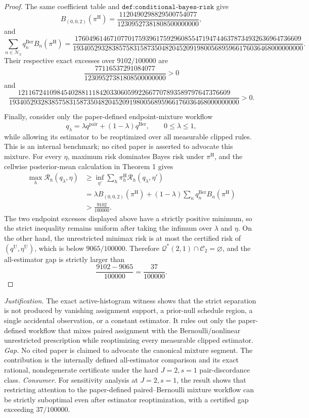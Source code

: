 \documentclass{article}
\begin{document}
\begin{proof}
The same coefficient table and \(\texttt{def:conditional-bayes-risk}\) give
\[
 B_{(0,0,2)}(\pi^{\mathrm H})
 =\frac{1120490298829500754077}{12309527381808500000000},
\]
and
\[
 \sum_{n\in\mathcal N_2}q_n^{\mathrm{Ber}}B_n(\pi^{\mathrm H})
 =\frac{1760496146710770175939617592960855471947446378734932636964736609}
 {19340529328385758315873504820452091980056895966176036468000000000}.
\]
Their respective exact excesses over \(9102/100000\) are
\[
 \frac{77116537291084077}{12309527381808500000000}>0
\]
and
\[
 \frac{121167241098454028811184203306059922667707893589797647376609}
 {19340529328385758315873504820452091980056895966176036468000000000}>0.
\]

Finally, consider only the paper-defined endpoint-mixture workflow
\[
 q_\lambda=\lambda q^{\mathrm{pair}}+(1-\lambda)q^{\mathrm{Ber}},
 \qquad 0\le\lambda\le1,
\]
while allowing its estimator to be reoptimized over all measurable clipped rules. This is an internal benchmark; no cited paper is asserted to advocate this mixture. For every \(\eta\), maximum risk dominates Bayes risk under \(\pi^{\mathrm H}\), and the cellwise posterior-mean calculation in Theorem 1 gives
\[
\begin{aligned}
 \max_h\mathcal R_h(q_\lambda,\eta)
 &\ge \inf_{\eta'}\sum_h\pi_h^{\mathrm H}
 \mathcal R_h(q_\lambda,\eta')\\
 &=\lambda B_{(0,0,2)}(\pi^{\mathrm H})
 +(1-\lambda)\sum_nq_n^{\mathrm{Ber}}B_n(\pi^{\mathrm H})\\
 &>\frac{9102}{100000}.
\end{aligned}
\]
The two endpoint excesses displayed above have a strictly positive minimum, so the strict inequality remains uniform after taking the infimum over \(\lambda\) and \(\eta\). On the other hand, the unrestricted minimax risk is at most the certified risk of \((q^{\mathrm U},\eta^{\mathrm U})\), which is below \(9065/100000\). Therefore \(\mathcal Q^*(2,1)\cap\mathcal C_2=\varnothing\), and the all-estimator gap is strictly larger than
\[
 \frac{9102-9065}{100000}=\frac{37}{100000}.
\]
\end{proof}
\par\smallskip\noindent \textit{Justification.} The exact active-histogram witness shows that the strict separation is not produced by vanishing assignment support, a prior-null schedule region, a single accidental observation, or a constant estimator. It rules out only the paper-defined workflow that mixes paired assignment with the Bernoulli/nonlinear unrestricted prescription while reoptimizing every measurable clipped estimator. \textit{Gap.} No cited paper is claimed to advocate the canonical mixture segment. The contribution is the internally defined all-estimator comparison and its exact rational, nondegenerate certificate under the hard \(J=2,s=1\) pair-discordance class. \textit{Consumer.} For sensitivity analysis at \(J=2,s=1\), the result shows that restricting attention to the paper-defined paired--Bernoulli mixture workflow can be strictly suboptimal even after estimator reoptimization, with a certified gap exceeding \(37/100000\).
\end{document}
